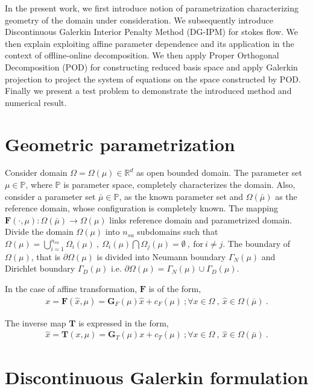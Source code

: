 \documentclass[graybox]{svmult}
\begin{document}
In the present work, we first introduce notion of parametrization characterizing geometry of the domain under consideration. We subsequently introduce Discontinuous Galerkin Interior Penalty Method (DG-IPM) for stokes flow. We then explain exploiting affine parameter dependence and its application in the context of offline-online decomposition. We then apply Proper Orthogonal Decomposition (POD) for constructing reduced basis space and apply Galerkin projection to project the system of equations on the space constructed by POD. Finally we present a test problem to demonstrate the introduced method and numerical result.

\section{Geometric parametrization}\label{geometric_parametrization_section}

Consider domain $\Omega = \Omega(\mu) \in \mathbb{R}^d$ as open bounded domain. The parameter set $\mu \in \mathbb{P}$, where $\mathbb{P}$ is parameter space, completely characterizes the domain. Also, consider a parameter set $\bar{\mu} \in \mathbb{P}$, as the known parameter set and $\Omega(\bar{\mu})$ as the reference domain, whose configuration is completely known. The mapping $\bm{F}(\cdot,\mu) : \Omega(\bar{\mu}) \rightarrow \Omega(\mu)$ links reference domain and parametrized domain. Divide the domain $\Omega(\mu)$ into $n_{su}$ subdomains such that $\Omega(\mu) = \bigcup\limits_{i=1}^{n_{su}} \Omega_i(\mu) \ , \ \Omega_i(\mu) \bigcap \Omega_j(\mu) = \emptyset \ , \ \text{for} \ i \neq j$. The boundary of $\Omega(\mu)$, that is $\partial \Omega(\mu)$ is divided into Neumann boundary $\Gamma_N(\mu)$ and Dirichlet boundary $\Gamma_D(\mu)$ i.e. $\partial \Omega(\mu) = \Gamma_N(\mu) \cup \Gamma_D(\mu)$.

In the case of affine transformation, $\bm{F}$ is of the form,
\begin{gather}\label{affine_F}
x = \bm{F}(\hat{x},\mu) = \bm{G}_F(\mu)\hat{x} + c_F(\mu) \ ; \forall x \in \Omega \ , \ \hat{x} \in \Omega(\bar{\mu}) \ .
\end{gather}

The inverse map $\bm{T}$ is expressed in the form,
\begin{gather}\label{affine_T}
\hat{x} = \bm{T}(x,\mu) = \bm{G}_T(\mu)x + c_T(\mu) \ ; \forall x \in \Omega \ , \ \hat{x} \in \Omega(\bar{\mu}) \ .
\end{gather}

\section{Discontinuous Galerkin formulation}
\label{DG_formulation}
\end{document}
